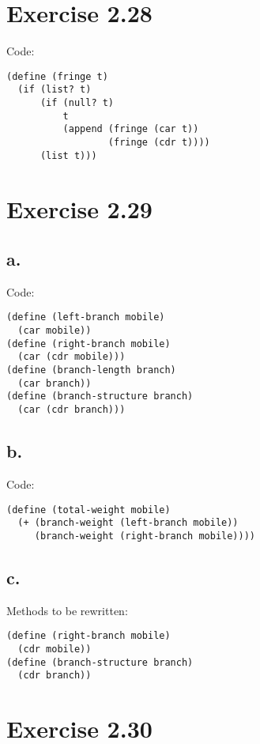 \documentclass[../main.tex]{subfiles}
\begin{document}
\section{Exercise 2.28}

Code:

\begin{lstlisting}
(define (fringe t)
  (if (list? t)
      (if (null? t)
          t
          (append (fringe (car t))
                  (fringe (cdr t))))
      (list t)))
\end{lstlisting}

\section{Exercise 2.29}

\subsection{a.}

Code:

\begin{lstlisting}
(define (left-branch mobile)
  (car mobile))
(define (right-branch mobile)
  (car (cdr mobile)))
(define (branch-length branch)
  (car branch))
(define (branch-structure branch)
  (car (cdr branch)))
\end{lstlisting}

\subsection{b.}

Code:

\begin{lstlisting}
(define (total-weight mobile)
  (+ (branch-weight (left-branch mobile))
     (branch-weight (right-branch mobile))))
\end{lstlisting}

\subsection{c.}

Methods to be rewritten:

\begin{lstlisting}
(define (right-branch mobile)
  (cdr mobile))
(define (branch-structure branch)
  (cdr branch))
\end{lstlisting}

\section{Exercise 2.30}
\end{document}
